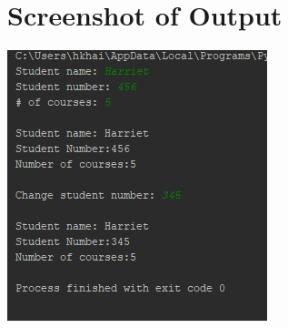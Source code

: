 \documentclass{article}
\begin{document}
\section*{Screenshot of Output}
\includegraphics[scale=1]{assignment3}

\newpage
\end{document}
